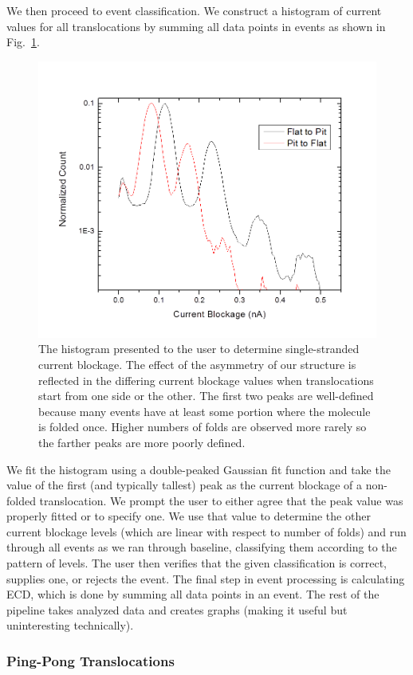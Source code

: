 \documentclass[aps,prl,preprint,groupedaddress]{revtex4}
\begin{document}
We then proceed to event classification.
We construct a histogram of current values for all translocations by summing all data points in events as shown in Fig.~\ref{fig:blockage-histogram}.
\begin{figure}[H]
\centering
\includegraphics[width=.8\textwidth]{figures/blockage-histogram}
\caption{The histogram presented to the user to determine single-stranded current blockage.
The effect of the asymmetry of our structure is reflected in the differing current blockage values when translocations start from one side or the other.
The first two peaks are well-defined because many events have at least some portion where the molecule is folded once.
Higher numbers of folds are observed more rarely so the farther peaks are more poorly defined.}
\label{fig:blockage-histogram}
\end{figure}
We fit the histogram using a double-peaked Gaussian fit function and take the value of the first (and typically tallest) peak as the current blockage of a non-folded translocation.
We prompt the user to either agree that the peak value was properly fitted or to specify one.
We use that value to determine the other current blockage levels (which are linear with respect to number of folds) and run through all events as we ran through baseline, classifying them according to the pattern of levels.
The user then verifies that the given classification is correct, supplies one, or rejects the event.
The final step in event processing is calculating ECD, which is done by summing all data points in an event.
The rest of the pipeline takes analyzed data and creates graphs (making it useful but uninteresting technically).

\subsubsection{Ping-Pong Translocations}
\end{document}
